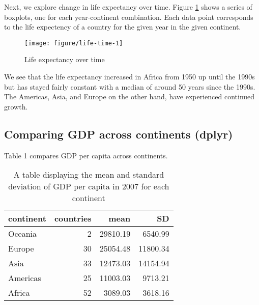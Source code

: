 \documentclass[english]{article}\usepackage[]{graphicx}\usepackage[]{color}
\makeatletter
\def\maxwidth{ %
  \ifdim\Gin@nat@width>\linewidth
    \linewidth
  \else
    \Gin@nat@width
  \fi
}
\newenvironment{knitrout}{}{} %
\makeatother
\begin{document}
Next, we explore change in life expectancy over time. Figure \ref{fig:life-time} shows a series of boxplots, one for each year-continent combination. Each data point corresponds to the life expectency of a country for the given year in the given continent.




\begin{knitrout}
\color{fgcolor}\begin{figure}[H]

{\centering \texttt{[image: figure/life-time-1]} 

}

\caption[Life expectancy over time]{Life expectancy over time}\label{fig:life-time}
\end{figure}


\end{knitrout}


We see that the life expectancy increased in Africa from 1950 up until the 1990s but has stayed fairly constant with a median of around 50 years since the 1990s. The Americas, Asia, and Europe on the other hand, have experienced continued growth. 

\subsection{Comparing GDP across continents (dplyr)}

Table 1 compares GDP per capita across continents.




\begin{table}[H]
\centering
\begin{tabular}{lrrr}
  \hline
continent & countries & mean & SD \\ 
  \hline
Oceania &   2 & 29810.19 & 6540.99 \\ 
  Europe &  30 & 25054.48 & 11800.34 \\ 
  Asia &  33 & 12473.03 & 14154.94 \\ 
  Americas &  25 & 11003.03 & 9713.21 \\ 
  Africa &  52 & 3089.03 & 3618.16 \\ 
   \hline
\end{tabular}
\caption{A table displaying the mean and standard deviation of GDP per capita in 2007 for each continent} 
\label{gdp_table}
\end{table}
\end{document}
